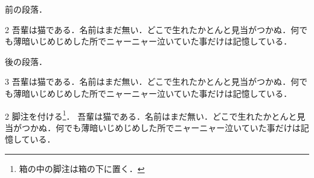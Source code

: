 \documentclass[paper=a6,fontsize=8pt]{jlreq}
\newcommand\para{吾輩は猫である．名前はまだ無い．どこで生れたかとんと見当がつかぬ．何でも薄暗いじめじめした所でニャーニャー泣いていた事だけは記憶している．\par}
\begin{document}
\begin{tcolorbox}[title=2段（multicols）]
前の段落．
\begin{multicols}{2}
\para
\end{multicols}
後の段落．
\end{tcolorbox}
\begin{tcolorbox}[title={3段，段間1字，罫なし}]
\begin{evenendmulticols}[columnsep=1\zw,columnseprule=0pt]{3}
\para
\end{evenendmulticols}
\end{tcolorbox}
\begin{tcolorbox}[title=columnbreakと脚注]
\begin{multicols}{2}
脚注を付ける\footnote{箱の中の脚注は箱の下に置く．}．\columnbreak
\para
\end{multicols}
\end{tcolorbox}
\end{document}

